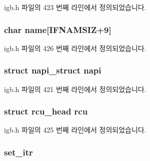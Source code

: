 igb.\+h 파일의 423 번째 라인에서 정의되었습니다.

\subsubsection[{\texorpdfstring{name}{name}}]{\setlength{\rightskip}{0pt plus 5cm}char name\mbox{[}{\bf I\+F\+N\+A\+M\+S\+IZ}+9\mbox{]}}\hypertarget{structigb__q__vector_a78c8fae70f1eba3f329993b447c05a02}{}\label{structigb__q__vector_a78c8fae70f1eba3f329993b447c05a02}


igb.\+h 파일의 426 번째 라인에서 정의되었습니다.

\subsubsection[{\texorpdfstring{napi}{napi}}]{\setlength{\rightskip}{0pt plus 5cm}struct napi\+\_\+struct napi}\hypertarget{structigb__q__vector_ad7946e6f4ab63e48db691b15b9a961d5}{}\label{structigb__q__vector_ad7946e6f4ab63e48db691b15b9a961d5}


igb.\+h 파일의 421 번째 라인에서 정의되었습니다.

\subsubsection[{\texorpdfstring{rcu}{rcu}}]{\setlength{\rightskip}{0pt plus 5cm}struct rcu\+\_\+head rcu}\hypertarget{structigb__q__vector_aa9677537ffa4e40f3c4f3e9fb3b4c76d}{}\label{structigb__q__vector_aa9677537ffa4e40f3c4f3e9fb3b4c76d}


igb.\+h 파일의 425 번째 라인에서 정의되었습니다.

\subsubsection[{\texorpdfstring{set\+\_\+itr}{set_itr}}]{ set\+\_\+itr}\hypertarget{structigb__q__vector_a8b09ab6906db061b3b98fe51c121631c}{}\label{structigb__q__vector_a8b09ab6906db061b3b98fe51c121631c}


